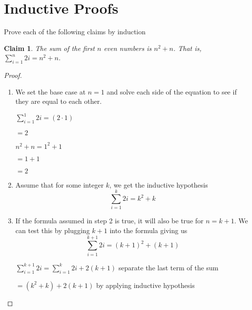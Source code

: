 \documentclass{article}
\newtheorem{claim}{Claim}
\begin{document}
    \section{Inductive Proofs}

    Prove each of the following claims by induction

    \begin{claim}
      The sum of the first $n$ even numbers is $n^2 + n$.  That is, 
      $\sum\limits_{i=1}^{n} 2i = n^2 + n$.
    \end{claim}

      \begin{proof}

        \begin{enumerate}

          \item We set the base case at $n=1$ and solve each side of the equation 
          to see if they are equal to each other.
          \vspace{0.5cm}

            $\sum\limits_{i=1}^{1} 2i = (2 \cdot 1)$

            \hspace{1cm}$= 2$
            
            \vspace{0.5cm}

            $n^2 + n = 1^2 + 1$ 

            \hspace{1cm}$= 1 + 1$

            \hspace{1cm}$= 2$

        \item Assume that for some integer $k$, we get the inductive hypothesis
        \[\sum\limits_{i=1}^{k} 2i = k^2 + k\]
        \vspace{.25cm}

        \item If the formula assumed in step 2 is true, it will also 
        be true for $n = k+1$. We can test this by plugging $k+1$ into
        the formula giving us
        \[\sum\limits_{i=1}^{k+1} 2i = (k+1)^2 + (k+1)\]

          $\sum\limits_{i=1}^{k+1} 2i = \sum\limits_{i=1}^{k} 2i + 2(k+1)$
          \hspace{1.5cm} separate the last term of the sum

          \hspace{1cm}$= (k^2 + k) + 2(k+1)$ 
          \hspace{1cm} by applying inductive hypothesis


\end{enumerate}
\end{proof}
\end{document}
